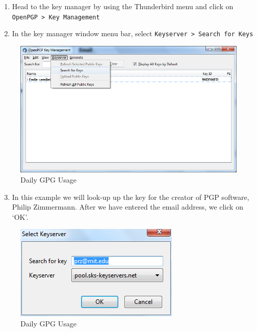 \begin{enumerate}[1.]
\item
  Head to the key manager by using the Thunderbird menu and click on
  \verb!OpenPGP > Key Management!
\item
  In the key manager window menu bar, select
  \verb!Keyserver > Search for Keys!
\end{enumerate}
\begin{figure}[htbp]
\centering
\includegraphics{daily_gpg_15.png}
\caption{Daily GPG Usage}
\end{figure}

\begin{enumerate}[1.]
\setcounter{enumi}{2}
\item
  In this example we will look-up up the key for the creator of PGP
  software, Philip Zimmermann. After we have entered the email address,
  we click on `OK'.
\end{enumerate}
\begin{figure}[htbp]
\centering
\includegraphics{daily_gpg_16.png}
\caption{Daily GPG Usage}
\end{figure}

